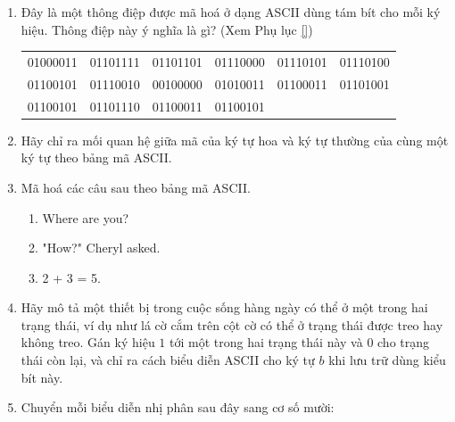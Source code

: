 \begin{enumerate}
\item Đây là một thông điệp được mã hoá ở dạng ASCII dùng tám bít cho mỗi ký hiệu. Thông
  điệp này ý nghĩa là gì? (Xem Phụ lục \ref{})

\begin{tabular}{cccccc}
  01000011 &01101111 &01101101 &01110000 &01110101 &01110100  \\
  01100101 &01110010 &00100000 &01010011 &01100011 &01101001  \\
  01100101 &01101110 &01100011 &01100101 & &
\end{tabular}


\item Hãy chỉ ra mối quan hệ giữa mã của ký tự hoa và ký tự thường của
  cùng một ký tự theo bảng mã ASCII.

\item Mã hoá các câu sau theo bảng mã ASCII.
  \begin{enumerate}
  \item Where are you?

  \item "How?" Cheryl asked.

  \item 2 + 3 = 5.
  \end{enumerate}

\item Hãy mô tả một thiết bị trong cuộc sống hàng ngày có thể ở một trong hai trạng thái,
  ví dụ như lá cờ cắm trên cột cờ có thể ở trạng thái được treo hay không treo. Gán ký
  hiệu $1$ tới một trong hai trạng thái này và $0$ cho trạng thái còn lại, và chỉ ra cách
  biểu diễn ASCII cho ký tự $b$ khi lưu trữ dùng kiểu bít này.

\item Chuyển mỗi biểu diễn nhị phân sau đây sang cơ số mười:



\end{enumerate}
